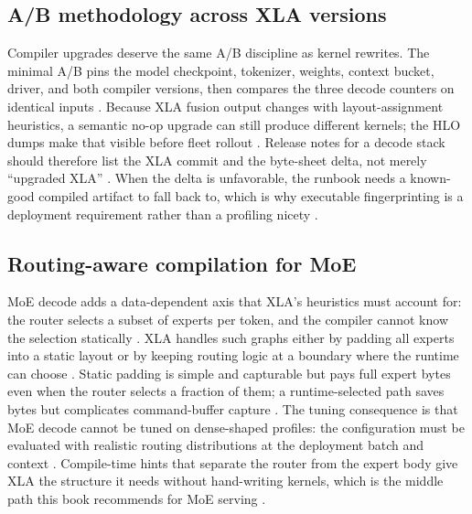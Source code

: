 \subsection{A/B methodology across XLA versions}

Compiler upgrades deserve the same A/B discipline as kernel rewrites. The minimal A/B pins the model checkpoint, tokenizer, weights, context bucket, driver, and both compiler versions, then compares the three decode counters on identical inputs \citep{taxbreak2026,patel2025llminference}. Because XLA fusion output changes with layout-assignment heuristics, a semantic no-op upgrade can still produce different kernels; the HLO dumps make that visible before fleet rollout \citep{openxla2024,chen2020compilerbasedhardw}. Release notes for a decode stack should therefore list the XLA commit and the byte-sheet delta, not merely ``upgraded XLA'' \citep{yirage2026,memoryfloor2026}. When the delta is unfavorable, the runbook needs a known-good compiled artifact to fall back to, which is why executable fingerprinting is a deployment requirement rather than a profiling nicety \citep{openxla2024,taxbreak2026}.

\subsection{Routing-aware compilation for MoE}

MoE decode adds a data-dependent axis that XLA's heuristics must account for: the router selects a subset of experts per token, and the compiler cannot know the selection statically \citep{liu2024deepseekv3,taxbreak2026}. XLA handles such graphs either by padding all experts into a static layout or by keeping routing logic at a boundary where the runtime can choose \citep{openxla2024,patel2025llminference}. Static padding is simple and capturable but pays full expert bytes even when the router selects a fraction of them; a runtime-selected path saves bytes but complicates command-buffer capture \citep{kwon2023vllm,memoryfloor2026}. The tuning consequence is that MoE decode cannot be tuned on dense-shaped profiles: the configuration must be evaluated with realistic routing distributions at the deployment batch and context \citep{liu2024deepseekv3,patel2025llminference}. Compile-time hints that separate the router from the expert body give XLA the structure it needs without hand-writing kernels, which is the middle path this book recommends for MoE serving \citep{chen2020compilerbasedhardw,yirage2026}.

